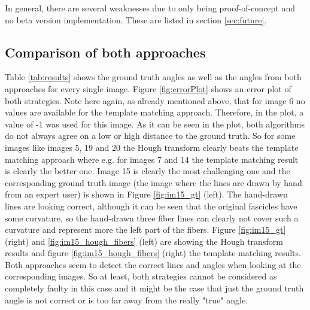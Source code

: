 \documentclass[10pt,twocolumn,letterpaper]{article}
\begin{document}
In general, there are several weaknesses due to only being proof-of-concept and no beta version implementation. These are listed in section \ref{sec:future}.

\subsection{Comparison of both approaches}

Table \ref{tab:results} shows the ground truth angles as well as the angles from both approaches for every single image.
Figure \ref{fig:errorPlot} shows an error plot of both strategies. Note here again, as already mentioned above, that for image 6 no values are available for the template matching approach. Therefore, in the plot, a value of -1 was used for this image.
As it can be seen in the plot, both algorithms do not always agree on a low or high distance to the ground truth. So for some images like images 5, 19 and 20 the Hough transform clearly beats the template matching approach where e.g. for images 7 and 14 the template matching result is clearly the better one.
Image 15 is clearly the most challenging one and the corresponding ground truth image (the image where the lines are drawn by hand from an expert user) is shown in Figure \ref{fig:im15_gt} (left). 
The hand-drawn lines are looking correct, although it can be seen that the original fascicles have some curvature, so the hand-drawn three fiber lines can clearly not cover such a curvature and represent more the left part of the fibers.
Figure \ref{fig:im15_gt} (right) and \ref{fig:im15_hough_fibers} (left) are showing the Hough transform results and figure \ref{fig:im15_hough_fibers} (right) the template matching results.
Both approaches seem to detect the correct lines and angles when looking at the corresponding images. So at least, both strategies cannot be considered as completely faulty in this case and it might be the case that just the ground truth angle is not correct or is too far away from the really "true" angle.
\end{document}
